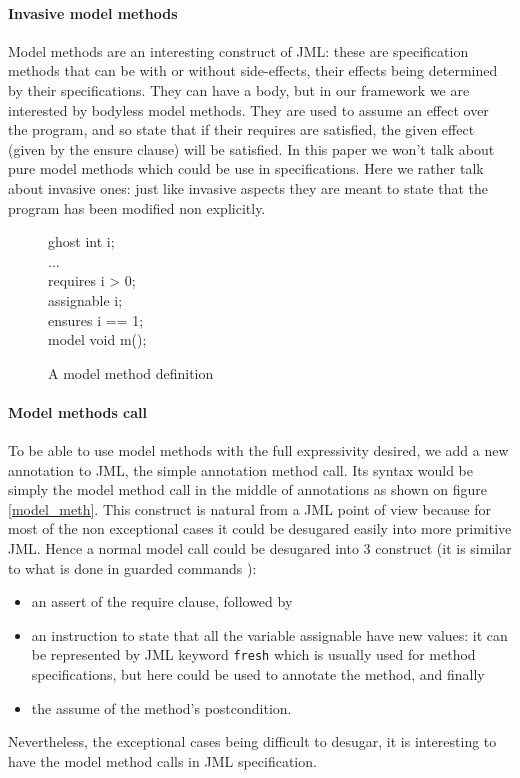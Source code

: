 \documentclass[draft]{llncs}
\begin{document}
\paragraph{Invasive model methods} 
Model methods are an interesting construct of JML: these are specification
methods that can be with or without side-effects, their effects being determined by their specifications.
They can have a body, but in our framework we are interested by bodyless model methods. They are used to 
assume an effect over the program, and so state that if their requires are satisfied, the given effect (given by
the ensure clause) will be satisfied.
In this paper we won't talk about pure model methods which could be use in specifications. Here we rather talk
about invasive ones: just like invasive aspects they are meant to state that the program has been modified 
non explicitly.
\begin{figure}
\begin{center}\begin{minipage}{3cm}
\bcode
ghost int i;\\
...\\
requires i > 0;\\
assignable i;\\
ensures i == 1;\\
model void m();
\ecode
\end{minipage}\end{center}
\caption{A model method definition}
\label{model_meth_def}
\end{figure}


\paragraph{Model methods call}
To be able to use model methods with the full expressivity desired, we add a new annotation to JML, the simple 
annotation method call. Its syntax would be simply the model method call in the middle of annotations as shown 
on figure \ref{model_meth}. This construct is natural from a JML point of view because for most of the non 
exceptional cases  it could be desugared easily into 
more primitive JML. Hence a normal model call could be desugared into 3 construct (it is similar to what is done
in guarded commands \cite{BarnettL05}):
\begin{itemize} 
\item an assert of the require clause, followed by 
\item an  instruction to state that all the variable assignable have new values: it can be represented by JML 
keyword {\tt fresh} which is usually used for method specifications, but here could be used to annotate the method, 
and finally 
\item the assume of the method's postcondition.
\end{itemize}
Nevertheless, the exceptional cases being difficult to desugar, it is interesting to have the model method calls in
JML specification.
\end{document}
